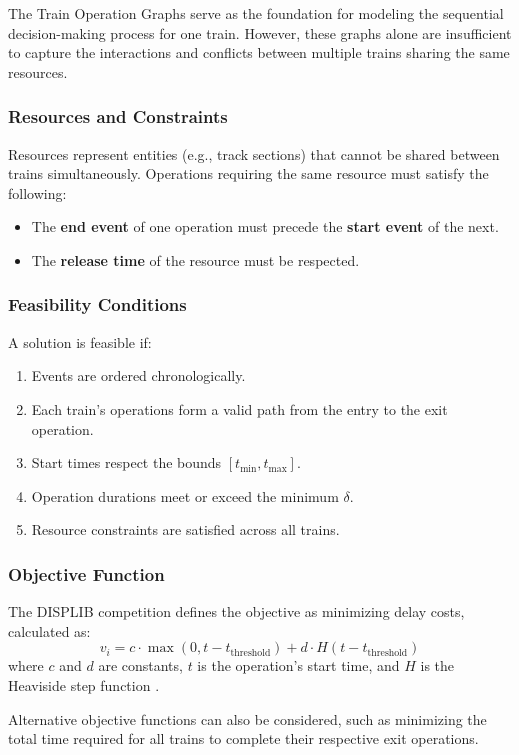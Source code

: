 \documentclass[runningheads]{llncs}
\begin{document}
The Train Operation Graphs serve as the foundation for modeling the sequential decision-making process for one train.
However, these graphs alone are insufficient to capture the interactions and conflicts between multiple trains sharing the same resources. 

\subsubsection{Resources and Constraints}
Resources represent entities (e.g., track sections) that cannot be shared between trains simultaneously. 
Operations requiring the same resource must satisfy the following:
\begin{itemize}
    \item The \textbf{end event} of one operation must precede the \textbf{start event} of the next.
    \item The \textbf{release time} of the resource must be respected.
\end{itemize}

\subsubsection{Feasibility Conditions}
A solution is feasible if:
\begin{enumerate}
    \item Events are ordered chronologically.
    \item Each train's operations form a valid path from the entry to the exit operation.
    \item Start times respect the bounds $[t_{\text{min}}, t_{\text{max}}]$.
    \item Operation durations meet or exceed the minimum $\delta$.
    \item Resource constraints are satisfied across all trains.
\end{enumerate}

\subsubsection{Objective Function}
The DISPLIB competition defines the objective as minimizing delay costs, calculated as:
\[
v_i = c \cdot \max(0, t - t_{\text{threshold}}) + d \cdot H(t - t_{\text{threshold}})
\]
where $c$ and $d$ are constants, $t$ is the operation's start time, and $H$ is the Heaviside step function \cite{train:DISPLIB2025}.

Alternative objective functions can also be considered, such as minimizing the total time required for all trains to complete their respective exit operations.
\end{document}
